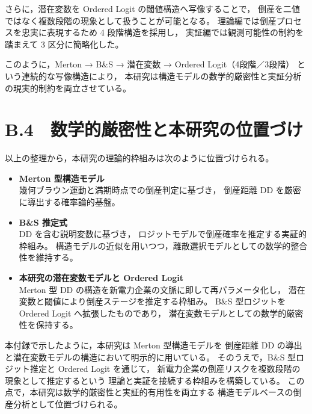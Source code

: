 さらに，潜在変数を Ordered Logit の閾値構造へ写像することで，
倒産を二値ではなく複数段階の現象として扱うことが可能となる。
理論編では倒産プロセスを忠実に表現するため 4 段階構造を採用し，
実証編では観測可能性の制約を踏まえて 3 区分に簡略化した。

このように，Merton → B\&S → 潜在変数 → Ordered Logit（4段階／3段階）
という連続的な写像構造により，
本研究は構造モデルの数学的厳密性と実証分析の現実的制約を両立させている。



\section*{B.4　数学的厳密性と本研究の位置づけ}

以上の整理から，本研究の理論的枠組みは次のように位置づけられる。

\begin{itemize}
  \item \textbf{Merton 型構造モデル}\\ 
  幾何ブラウン運動と満期時点での倒産判定に基づき，
  倒産距離 DD を厳密に導出する確率論的基盤。

  \item \textbf{B\&S 推定式}\\ 
  DD を含む説明変数に基づき，
  ロジットモデルで倒産確率を推定する実証的枠組み。
  構造モデルの近似を用いつつ，離散選択モデルとしての数学的整合性を維持する。

  \item \textbf{本研究の潜在変数モデルと Ordered Logit}\\
  Merton 型 DD の構造を新電力企業の文脈に即して再パラメータ化し，
  潜在変数と閾値により倒産ステージを推定する枠組み。
  B\&S 型ロジットを Ordered Logit へ拡張したものであり，
  潜在変数モデルとしての数学的厳密性を保持する。
\end{itemize}

本付録で示したように，本研究は Merton 型構造モデルを
倒産距離 DD の導出と潜在変数モデルの構造において明示的に用いている。
そのうえで，B\&S 型ロジット推定と Ordered Logit を通じて，
新電力企業の倒産リスクを複数段階の現象として推定するという
理論と実証を接続する枠組みを構築している。
この点で，本研究は数学的厳密性と実証的有用性を両立する
構造モデルベースの倒産分析として位置づけられる。
